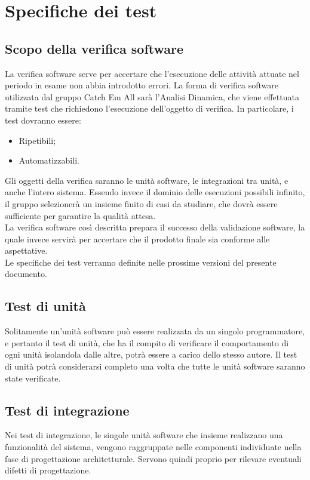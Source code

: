 \section{Specifiche dei test}

\subsection{Scopo della verifica software}
La verifica software serve per accertare che l'esecuzione delle attività attuate nel periodo in esame non abbia introdotto errori. La forma di verifica software utilizzata dal gruppo Catch Em All sarà l'Analisi Dinamica, che viene effettuata tramite test che richiedono l'esecuzione dell'oggetto di verifica. In particolare, i test dovranno essere:
\begin{itemize}
	\item Ripetibili;
	\item Automatizzabili.
\end{itemize}
Gli oggetti della verifica saranno le unità software, le integrazioni tra unità, e anche l'intero sistema. Essendo invece il dominio delle esecuzioni possibili infinito, il gruppo selezionerà un insieme finito di casi da studiare, che dovrà essere sufficiente per garantire la qualità attesa.\\
La verifica software così descritta prepara il successo della validazione software, la quale invece servirà per accertare che il prodotto finale sia conforme alle aspettative.\\
Le specifiche dei test verranno definite nelle prossime versioni del presente documento.
\subsection{Test di unità}
Solitamente un'unità software può essere realizzata da un singolo programmatore, e pertanto il test di unità, che ha il compito di verificare il comportamento di ogni unità isolandola dalle altre, potrà essere a carico dello stesso autore. Il test di unità potrà considerarsi completo una volta che tutte le unità software saranno state verificate.

\subsection{Test di integrazione}
Nei test di integrazione, le singole unità software che insieme realizzano una funzionalità del sistema, vengono raggruppate nelle componenti individuate nella fase di progettazione architetturale. Servono quindi proprio per rilevare eventuali difetti di progettazione.

